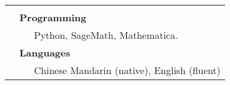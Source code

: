 \documentclass[letterpaper, 11pt]{article}
\newcommand{\mycolor}[0]{\color{RoyalBlue}}
\begin{document}
\begin{longtable}{p{1.5in}p{4.9in}}
& \\



{\mycolor{Skills}} 
& \textbf{Programming}\\
&\ \ \ Python, SageMath, Mathematica. \\
& \textbf{Languages} \\
&\ \ \ Chinese Mandarin (native), English (fluent) \\







\end{longtable}
\end{document}
